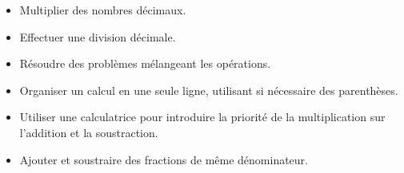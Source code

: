 \documentclass[a4paper,12pt,fleqn]{article}	
\begin{document}
\begin{itemize}
	\item {}Multiplier des nombres décimaux.
	\item {}Effectuer une division décimale.
	\item {}Résoudre des problèmes mélangeant les opérations.
	\item {}Organiser un calcul en une seule ligne, utilisant si nécessaire des parenthèses.
	\item {}Utiliser une calculatrice pour introduire la priorité de la multiplication sur l’addition et la soustraction.
	\item {}Ajouter et soustraire des fractions de même dénominateur.

\end{itemize}


	
\end{document}
